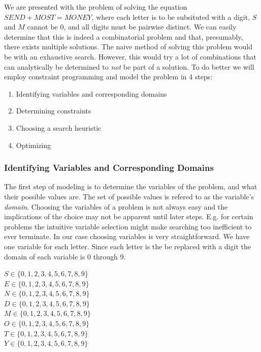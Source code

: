 We are presented with the problem of solving the equation $SEND + MOST = MONEY$, where
each letter is to be subsituted with a digit, $S$ and $M$ cannot be 0, and all digits must
be pairwise distinct. We can easily determine that this is indeed a combinatorial problem
and that, presumably, there exists multiple solutions. The naive method of solving this
problem would be with an exhaustive search. However, this would try a lot of combinations
that can analytically be determined to \textit{not} be part of a solution. To do better we
will employ constraint programming and model the problem in 4 steps:

\begin{enumerate}
	\item Identifying variables and corresponding domains
	\item Determining constraints
	\item Choosing a search heuristic
	\item Optimizing
\end{enumerate}

\subsubsection{Identifying Variables and Corresponding Domains}

The first step of modeling is to determine the variables of the problem, and what their
possible values are. The set of possible values is refered to as the variable's \textit{
domain}. Choosing the variables of a problem is not always easy and the implications
of the choice may not be apparent until later steps. E.g. for certain problems the intuitive
variable selection might make searching too inefficient to ever terminate. In our case
choosing variables is very straightforward. We have one variable for each letter. Since
each letter is the be replaced with a digit the domain of each variable is 0 through 9.

\vspace{0.5cm}
\noindent
$S \in \{0, 1, 2, 3, 4, 5, 6, 7, 8, 9\}$ \\
$E \in \{0, 1, 2, 3, 4, 5, 6, 7, 8, 9\}$ \\
$N \in \{0, 1, 2, 3, 4, 5, 6, 7, 8, 9\}$ \\
$D \in \{0, 1, 2, 3, 4, 5, 6, 7, 8, 9\}$ \\
$M \in \{0, 1, 2, 3, 4, 5, 6, 7, 8, 9\}$ \\
$O \in \{0, 1, 2, 3, 4, 5, 6, 7, 8, 9\}$ \\
$T \in \{0, 1, 2, 3, 4, 5, 6, 7, 8, 9\}$ \\
$Y \in \{0, 1, 2, 3, 4, 5, 6, 7, 8, 9\}$

